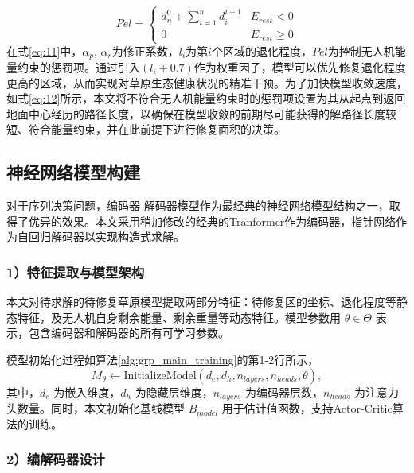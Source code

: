 \documentclass[AutoFakeBold]{LZUThesis}
\begin{document}
\begin{equation}
	Pel=\left\{\begin{array}{ll}
		d_{n}^{0}+\sum\limits_{i=1}^{n}d_{i}^{i+1} & E_{rest}<0     \\
		0                                          & E_{rest}\geq 0
	\end{array}\right.
	\label{eq:12}
\end{equation}
在式\eqref{eq:11}中，$\alpha_p$, $\alpha_r$为修正系数，$l_i$为第$i$个区域的退化程度，$Pel$为控制无人机能量约束的惩罚项。通过引入$(l_i+0.7)$作为权重因子，模型可以优先修复退化程度更高的区域，从而实现对草原生态健康状况的精准干预。为了加快模型收敛速度，如式\eqref{eq:12}所示，本文将不符合无人机能量约束时的惩罚项设置为其从起点到返回地面中心经历的路径长度，以确保在模型收敛的前期尽可能获得的解路径长度较短、符合能量约束，并在此前提下进行修复面积的决策。

\subsection{神经网络模型构建}

对于序列决策问题，编码器-解码器模型\cite{vaswani2017attention}作为最经典的神经网络模型结构之一，取得了优异的效果。本文采用稍加修改的经典的Tranformer作为编码器，指针网络\cite{vinyals2015pointer}作为自回归解码器以实现构造式求解。

\subsubsection{1）特征提取与模型架构}

本文对待求解的待修复草原模型提取两部分特征：待修复区的坐标、退化程度等静态特征，及无人机自身剩余能量、剩余重量等动态特征。模型参数用 $\theta \in \Theta$ 表示，包含编码器和解码器的所有可学习参数。

模型初始化过程如算法\ref{alg:grp_main_training}的第1-2行所示，
\begin{equation}
	M_{\theta} \leftarrow \text{InitializeModel}(d_e, d_h, n_{layers}, n_{heads}, \theta),
\end{equation}
其中，$d_e$ 为嵌入维度，$d_h$ 为隐藏层维度，$n_{layers}$ 为编码器层数，$n_{heads}$ 为注意力头数量。同时，本文初始化基线模型 $B_{model}$ 用于估计值函数，支持Actor-Critic算法的训练。

\subsubsection{2）编解码器设计}
\end{document}
